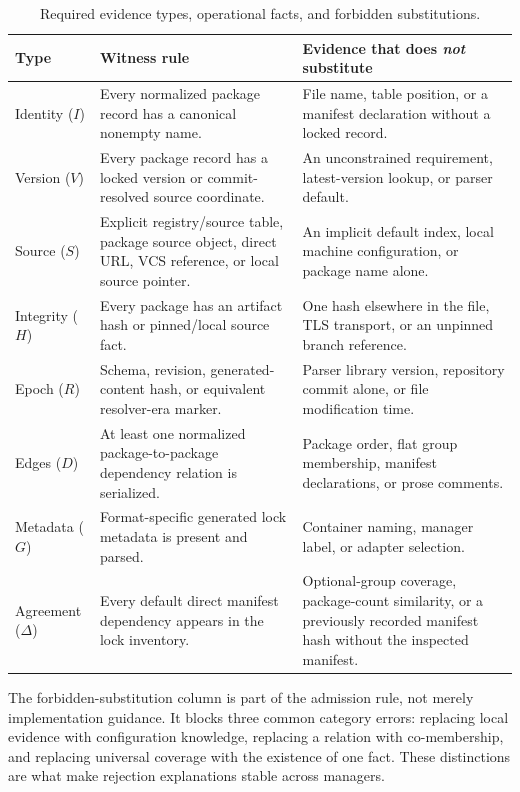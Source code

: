 \documentclass[10pt,conference]{IEEEtran}
\begin{document}
\begin{table}[t]
\caption{Required evidence types, operational facts, and forbidden substitutions.}
\centering\small
\begin{tabularx}{\textwidth}{p{}X X}
\toprule
Type & Witness rule & Evidence that does \emph{not} substitute\\
\midrule
Identity ($I$) & Every normalized package record has a canonical nonempty name. & File name, table position, or a manifest declaration without a locked record.\\
Version ($V$) & Every package record has a locked version or commit-resolved source coordinate. & An unconstrained requirement, latest-version lookup, or parser default.\\
Source ($S$) & Explicit registry/source table, package source object, direct URL, VCS reference, or local source pointer. & An implicit default index, local machine configuration, or package name alone.\\
Integrity ($H$) & Every package has an artifact hash or pinned/local source fact. & One hash elsewhere in the file, TLS transport, or an unpinned branch reference.\\
Epoch ($R$) & Schema, revision, generated-content hash, or equivalent resolver-era marker. & Parser library version, repository commit alone, or file modification time.\\
Edges ($D$) & At least one normalized package-to-package dependency relation is serialized. & Package order, flat group membership, manifest declarations, or prose comments.\\
Metadata ($G$) & Format-specific generated lock metadata is present and parsed. & Container naming, manager label, or adapter selection.\\
Agreement ($\Delta$) & Every default direct manifest dependency appears in the lock inventory. & Optional-group coverage, package-count similarity, or a previously recorded manifest hash without the inspected manifest.\\
\bottomrule
\end{tabularx}
\label{tab:obligations}
\end{table}

The forbidden-substitution column is part of the admission rule, not merely implementation guidance. It blocks three common category errors: replacing local evidence with configuration knowledge, replacing a relation with co-membership, and replacing universal coverage with the existence of one fact. These distinctions are what make rejection explanations stable across managers.
\end{document}
